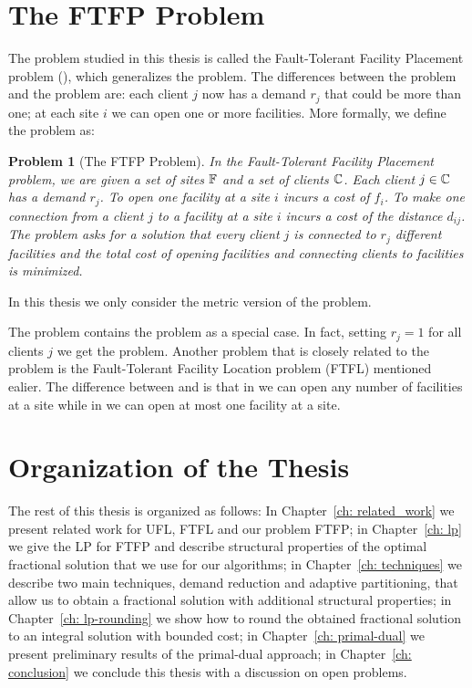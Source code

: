\documentclass[oneside,final]{ucr}
\newtheorem{problem}[theorem]{Problem}
\begin{document}
\section{The FTFP Problem}
The problem studied in this thesis is called the
Fault-Tolerant Facility Placement problem (\FTFP), which
generalizes the {\UFL} problem. The differences between the
{\UFL} problem and the {\FTFP} problem are: each client $j$
now has a demand $r_j$ that could be more than one; at each
site $i$ we can open one or more facilities. More formally,
we define the {\FTFP} problem as:
\begin{problem}[The FTFP Problem]
  \label{problem:ftfp}
  In the Fault-Tolerant Facility Placement problem,
  we are given a set of sites $\mathbb{F}$ and a set of
  clients $\mathbb{C}$. Each client $j \in \mathbb{C}$ has a
  demand $r_j$. To open one facility at a site $i$ incurs a
  cost of $f_i$. To make one connection from a client $j$ to
  a facility at a site $i$ incurs a cost of the distance
  $d_{ij}$. The problem asks for a solution that every
  client $j$ is connected to $r_j$ different facilities and
  the total cost of opening facilities and connecting
  clients to facilities is minimized.
\end{problem}
In this thesis we only consider the metric version of the
{\FTFP} problem. 

The {\FTFP} problem contains the {\UFL} problem as a special
case. In fact, setting $r_j = 1$ for all clients $j$ we get
the {\UFL} problem. Another problem that is closely related
to the {\FTFP} problem is the Fault-Tolerant Facility
Location problem (FTFL) mentioned ealier. The difference
between {\FTFP} and {\FTFL} is that in {\FTFP} we can open
any number of facilities at a site while in {\FTFL} we can
open at most one facility at a site.

\section{Organization of the Thesis}
The rest of this thesis is organized as follows: In
Chapter~\ref{ch: related_work} we present related work for
UFL, FTFL and our problem FTFP; in Chapter~\ref{ch: lp} we
give the LP for FTFP and describe structural properties of
the optimal fractional solution that we use for our
algorithms; in Chapter~\ref{ch: techniques} we describe two
main techniques, demand reduction and adaptive partitioning,
that allow us to obtain a fractional solution with
additional structural properties; in Chapter~\ref{ch:
  lp-rounding} we show how to round the obtained fractional
solution to an integral solution with bounded cost; in
Chapter~\ref{ch: primal-dual} we present preliminary results
of the primal-dual approach; in Chapter~\ref{ch: conclusion}
we conclude this thesis with a discussion on open problems.
\end{document}
